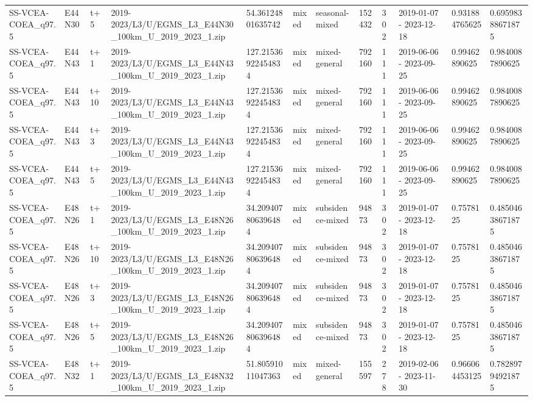 \begin{landscape}
\begin{longtable}{llllllllllll}
SS-VCEA-COEA\_q97.5 & E44N30 & t+5 & 2019-2023/L3/U/EGMS\_L3\_E44N30\_100km\_U\_2019\_2023\_1.zip & 54.36124801635742 & mixed & seasonal-mixed & 152432 & 302 & 2019-01-07 - 2023-12-18 & 0.931884765625 & 0.69598388671875 \\
SS-VCEA-COEA\_q97.5 & E44N43 & t+1 & 2019-2023/L3/U/EGMS\_L3\_E44N43\_100km\_U\_2019\_2023\_1.zip & 127.21536922454834 & mixed & mixed-general & 792160 & 111 & 2019-06-06 - 2023-09-25 & 0.99462890625 & 0.9840087890625 \\
SS-VCEA-COEA\_q97.5 & E44N43 & t+10 & 2019-2023/L3/U/EGMS\_L3\_E44N43\_100km\_U\_2019\_2023\_1.zip & 127.21536922454834 & mixed & mixed-general & 792160 & 111 & 2019-06-06 - 2023-09-25 & 0.99462890625 & 0.9840087890625 \\
SS-VCEA-COEA\_q97.5 & E44N43 & t+3 & 2019-2023/L3/U/EGMS\_L3\_E44N43\_100km\_U\_2019\_2023\_1.zip & 127.21536922454834 & mixed & mixed-general & 792160 & 111 & 2019-06-06 - 2023-09-25 & 0.99462890625 & 0.9840087890625 \\
SS-VCEA-COEA\_q97.5 & E44N43 & t+5 & 2019-2023/L3/U/EGMS\_L3\_E44N43\_100km\_U\_2019\_2023\_1.zip & 127.21536922454834 & mixed & mixed-general & 792160 & 111 & 2019-06-06 - 2023-09-25 & 0.99462890625 & 0.9840087890625 \\
SS-VCEA-COEA\_q97.5 & E48N26 & t+1 & 2019-2023/L3/U/EGMS\_L3\_E48N26\_100km\_U\_2019\_2023\_1.zip & 34.209407806396484 & mixed & subsidence-mixed & 94873 & 302 & 2019-01-07 - 2023-12-18 & 0.7578125 & 0.48504638671875 \\
SS-VCEA-COEA\_q97.5 & E48N26 & t+10 & 2019-2023/L3/U/EGMS\_L3\_E48N26\_100km\_U\_2019\_2023\_1.zip & 34.209407806396484 & mixed & subsidence-mixed & 94873 & 302 & 2019-01-07 - 2023-12-18 & 0.7578125 & 0.48504638671875 \\
SS-VCEA-COEA\_q97.5 & E48N26 & t+3 & 2019-2023/L3/U/EGMS\_L3\_E48N26\_100km\_U\_2019\_2023\_1.zip & 34.209407806396484 & mixed & subsidence-mixed & 94873 & 302 & 2019-01-07 - 2023-12-18 & 0.7578125 & 0.48504638671875 \\
SS-VCEA-COEA\_q97.5 & E48N26 & t+5 & 2019-2023/L3/U/EGMS\_L3\_E48N26\_100km\_U\_2019\_2023\_1.zip & 34.209407806396484 & mixed & subsidence-mixed & 94873 & 302 & 2019-01-07 - 2023-12-18 & 0.7578125 & 0.48504638671875 \\
SS-VCEA-COEA\_q97.5 & E48N32 & t+1 & 2019-2023/L3/U/EGMS\_L3\_E48N32\_100km\_U\_2019\_2023\_1.zip & 51.80591011047363 & mixed & mixed-general & 155597 & 278 & 2019-02-06 - 2023-11-30 & 0.966064453125 & 0.78289794921875 \\

\end{longtable}
\end{landscape}
